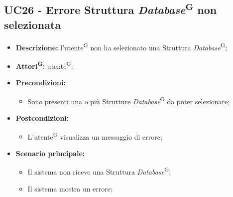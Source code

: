 \subsection{UC26 - Errore Struttura \textit{Database}\textsuperscript{G} non selezionata}
\label{sec:UC26}
\begin{itemize}
	\item \textbf{Descrizione:} l’utente\textsuperscript{G} non ha selezionato una Struttura \textit{Database}\textsuperscript{G};
	\item \textbf{Attori\textsuperscript{G}:} utente\textsuperscript{G};
	\item \textbf{Precondizioni:}
	\begin{itemize}
		\item Sono presenti una o più Strutture \textit{Database}\textsuperscript{G} da poter selezionare;
	\end{itemize}
	\item \textbf{Postcondizioni:}
	\begin{itemize}
		\item L’utente\textsuperscript{G} visualizza un messaggio di errore;
	\end{itemize}
	\item \textbf{Scenario principale:}
	\begin{itemize}
		\item Il sistema non riceve una Struttura \textit{Database}\textsuperscript{G};
		\item Il sistema mostra un errore;
	\end{itemize}
\end{itemize}

